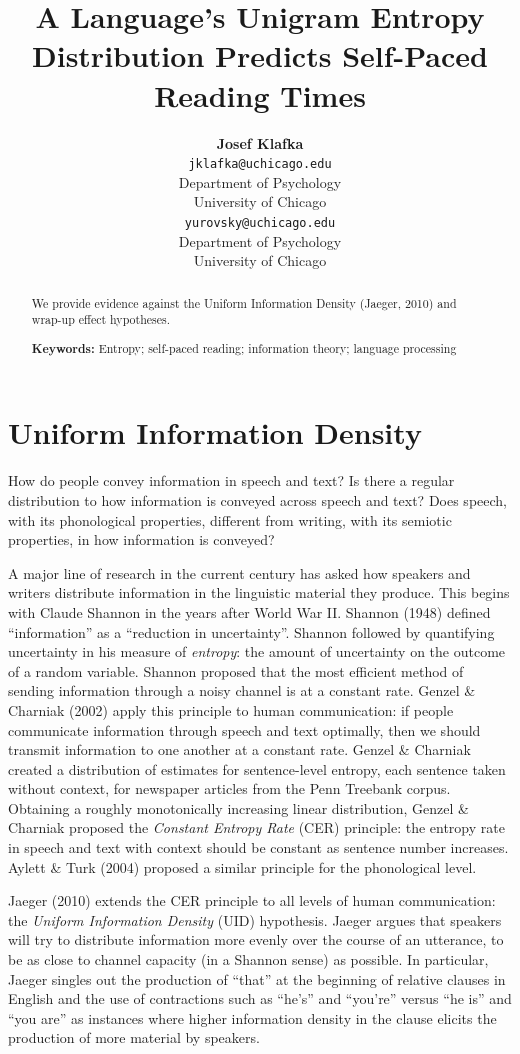 \documentclass[10pt, letterpaper]{article}
\title{A Language's Unigram Entropy Distribution Predicts Self-Paced Reading
Times}
\author{{\large \bf Josef Klafka} \\ \texttt{jklafka@uchicago.edu} \\ Department of Psychology \\ University of Chicago \And {\large \bf Daniel Yurovsky} \\ \texttt{yurovsky@uchicago.edu} \\ Department of Psychology \\ University of Chicago}
\begin{document}
\maketitle

\begin{abstract}
We provide evidence against the Uniform Information Density (Jaeger,
2010) and wrap-up effect hypotheses.

\textbf{Keywords:}
Entropy; self-paced reading; information theory; language processing
\end{abstract}

\section{Uniform Information Density}\label{uniform-information-density}

How do people convey information in speech and text? Is there a regular
distribution to how information is conveyed across speech and text? Does
speech, with its phonological properties, different from writing, with
its semiotic properties, in how information is conveyed?

A major line of research in the current century has asked how speakers
and writers distribute information in the linguistic material they
produce. This begins with Claude Shannon in the years after World War
II. Shannon (1948) defined ``information'' as a ``reduction in
uncertainty''. Shannon followed by quantifying uncertainty in his
measure of \emph{entropy}: the amount of uncertainty on the outcome of a
random variable. Shannon proposed that the most efficient method of
sending information through a noisy channel is at a constant rate.
Genzel \& Charniak (2002) apply this principle to human communication:
if people communicate information through speech and text optimally,
then we should transmit information to one another at a constant rate.
Genzel \& Charniak created a distribution of estimates for
sentence-level entropy, each sentence taken without context, for
newspaper articles from the Penn Treebank corpus. Obtaining a roughly
monotonically increasing linear distribution, Genzel \& Charniak
proposed the \emph{Constant Entropy Rate} (CER) principle: the entropy
rate in speech and text with context should be constant as sentence
number increases. Aylett \& Turk (2004) proposed a similar principle for
the phonological level.

Jaeger (2010) extends the CER principle to all levels of human
communication: the \emph{Uniform Information Density} (UID) hypothesis.
Jaeger argues that speakers will try to distribute information more
evenly over the course of an utterance, to be as close to channel
capacity (in a Shannon sense) as possible. In particular, Jaeger singles
out the production of ``that'' at the beginning of relative clauses in
English and the use of contractions such as ``he's'' and ``you're''
versus ``he is'' and ``you are'' as instances where higher information
density in the clause elicits the production of more material by
speakers.
\end{document}
